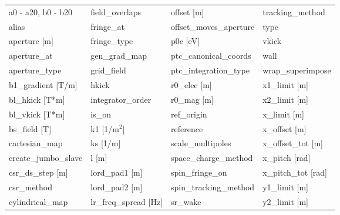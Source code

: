  \begin{tabular}{llll} \toprule
a0 - a20, b0 - b20               & field_overlaps                   & offset [m]                       & tracking_method                  \\
alias                            & fringe_at                        & offset_moves_aperture            & type                             \\
aperture [m]                     & fringe_type                      & p0c [eV]                         & vkick                            \\
aperture_at                      & gen_grad_map                     & ptc_canonical_coords             & wall                             \\
aperture_type                    & grid_field                       & ptc_integration_type             & wrap_superimpose                 \\
b1_gradient [T/m]                & hkick                            & r0_elec [m]                      & x1_limit [m]                     \\
bl_hkick [T*m]                   & integrator_order                 & r0_mag [m]                       & x2_limit [m]                     \\
bl_vkick [T*m]                   & is_on                            & ref_origin                       & x_limit [m]                      \\
bs_field [T]                     & k1 [1/m$^2$]                     & reference                        & x_offset [m]                     \\
cartesian_map                    & ks [1/m]                         & scale_multipoles                 & x_offset_tot [m]                 \\
create_jumbo_slave               & l [m]                            & space_charge_method              & x_pitch [rad]                    \\
csr_ds_step [m]                  & lord_pad1 [m]                    & spin_fringe_on                   & x_pitch_tot [rad]                \\
csr_method                       & lord_pad2 [m]                    & spin_tracking_method             & y1_limit [m]                     \\
cylindrical_map                  & lr_freq_spread [Hz]              & sr_wake                          & y2_limit [m]                     \\

\end{tabular}
